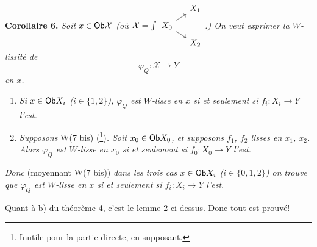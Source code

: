 \textbf{Corollaire 6.} \textit{Soit $x \in \mathsf{Ob} \mathcal{X}$ (où $\mathcal{X} = \int \begin{tikzcd}[ampersand replacement=\&, row sep=tiny, column sep=small, baseline=(\tikzcdmatrixname-2-1.base)] \& X_1 \\ X_0 \ar[ur]\ar[dr] \& \\ \& X_2 \end{tikzcd}$.) On veut exprimer la $W$-lissité de}
\[
\varphi_Q : \mathcal{X} \longrightarrow Y
\]
\textit{en $x$.}

\begin{enumerate}[label={}, leftmargin=2.5em]
\item[\textit{a)}] \textit{Si $x \in \mathsf{Ob} X_i$ ($i \in \{1,2\}$), $\varphi_Q$ est $W$-lisse en $x$ si et seulement si $f_i : X_i \longrightarrow Y$ l'est.}
\item[\textit{b)}] \textit{Supposons} \textup{W(7 bis)} (\footnote[108]{Inutile pour la partie directe, en supposant.})\textit{. Soit $x_0 \in \mathsf{Ob} X_0$, et supposons $f_1$, $f_2$ lisses en $x_1$, $x_2$. Alors $\varphi_Q$ est $W$-lisse en $x_0$ si et seulement si $f_0 : X_0 \longrightarrow Y$ l'est.}
\end{enumerate}

\textit{Donc} (moyennant W(7 bis)) \textit{dans les trois cas $x \in \mathsf{Ob} X_i$ ($i \in \{0,1,2\}$) on trouve que $\varphi_Q$ est $W$-lisse en $x$ si et seulement si $f_i : X_i \longrightarrow Y$ l'est}.

 Quant à b) du théorème 4, c'est le lemme 2 ci-dessus. Donc tout est prouvé!


